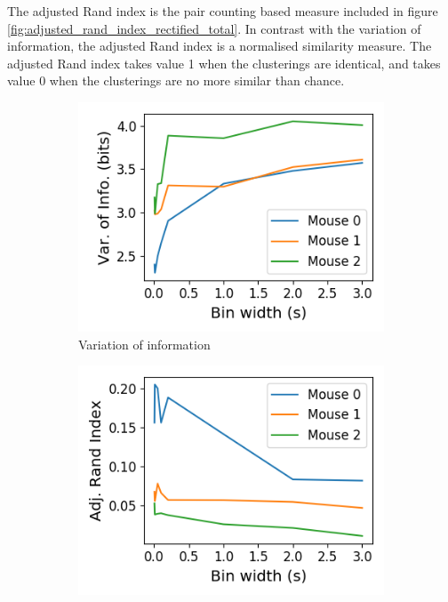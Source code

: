   The adjusted Rand index is the pair counting based measure included in figure \ref{fig:adjusted_rand_index_rectified_total}. In contrast with the variation of information, the adjusted Rand index is a normalised similarity measure. The adjusted Rand index takes value 1 when the clusterings are identical, and takes value 0 when the clusterings are no more similar than chance.

  \begin{figure}[h]
    \begin{subfigure}[h]{0.5\linewidth}
      \includegraphics[width=\linewidth]{figures/eight_probe/variation_of_information_rectified_total.png}
      \caption{Variation of information}
      \label{fig:variation_of_information_rectified_total}
    \end{subfigure}
    \begin{subfigure}[h]{0.5\linewidth}
      \includegraphics[width=\linewidth]{figures/eight_probe/adjusted_rand_index_rectified_total.png}

\end{subfigure}
\end{figure}
